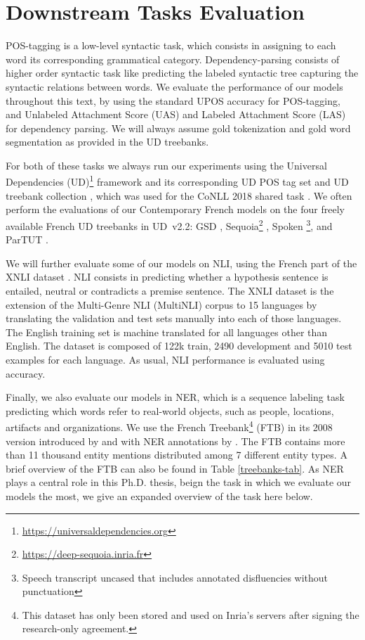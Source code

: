 \section{Downstream Tasks Evaluation}\label{MethodEVAL}

POS-tagging is a low-level syntactic task, which consists in assigning to each word its corresponding grammatical category. Dependency-parsing consists of higher order syntactic task like predicting the labeled syntactic tree capturing the syntactic relations between words. We evaluate the performance of our models throughout this text, by using the standard UPOS accuracy for POS-tagging, and Unlabeled Attachment Score (UAS) and Labeled Attachment Score (LAS) for dependency parsing. We will always assume gold tokenization and gold word segmentation as provided in the UD treebanks.

For both of these tasks we always run our experiments using the Universal Dependencies (UD)\footnote{\url{https://universaldependencies.org}} framework and its corresponding UD POS tag set \citep{petrov-etal-2012-universal} and UD treebank collection \citep{nivre-etal-2018-universal}, which was used for the CoNLL 2018 shared task \citep{seker-etal-2018-universal}. We often perform the evaluations of our Contemporary French models on the four freely available French UD treebanks in UD~v2.2: GSD \citep{mcdonald-etal-2013-universal}, Sequoia\footnote{\url{https://deep-sequoia.inria.fr}} \citep{candito-seddah-2012-le,candito-etal-2014-deep}, Spoken \citep{lacheret-etal-2014-rhapsodie,bawden-etal-2014-correcting}\footnote{Speech transcript uncased that includes annotated disfluencies without punctuation}, and ParTUT \citep{sanguinetti-Bosco-2015-parttut}.

We will further evaluate some of our models on NLI, using the French part of the XNLI dataset \citep{conneau-etal-2018-xnli}. NLI consists in predicting whether a hypothesis sentence is entailed, neutral or contradicts a premise sentence. The XNLI dataset is the extension of the Multi-Genre NLI (MultiNLI) corpus \citep{williams-etal-2018-broad} to 15 languages by translating the validation and test sets manually into each of those languages. The English training set is machine translated for all languages other than English. The dataset is composed of 122k train, 2490 development and 5010 test examples for each language. As usual, NLI performance is evaluated using accuracy.

Finally, we also evaluate our models in NER, which is a sequence labeling task predicting which words refer to real-world objects, such as people, locations, artifacts and organizations. We use the French Treebank\footnote{This dataset has only been stored and used on Inria's servers after signing the research-only agreement.} (FTB) \citep{abeille-etal-2003-building} in its 2008 version introduced by \citet{candito-crabbe-2009-improving} and with NER annotations by \citet{sagot-etal-2012-annotation}. The FTB contains more than 11 thousand entity mentions distributed among 7 different entity types. A brief overview of the FTB can also be found in Table \ref{treebanks-tab}. As NER plays a central role in this Ph.D. thesis, beign the task in which we evaluate our models the most, we give an expanded overview of the task here below.

